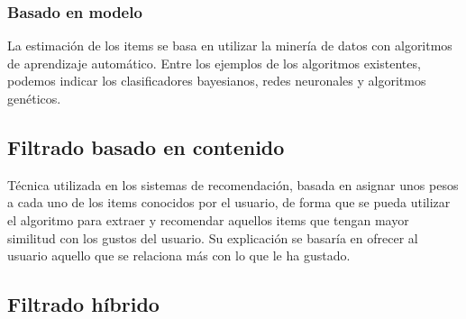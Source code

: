 \subsubsection{Basado en modelo}
La estimación de los items se basa en utilizar la minería de datos con algoritmos de aprendizaje automático. Entre los ejemplos de los algoritmos existentes, podemos indicar los clasificadores bayesianos, redes neuronales y algoritmos genéticos.\nocite{wiki:filtrado} 


\subsection{Filtrado basado en contenido}
Técnica utilizada en los sistemas de recomendación,  basada en asignar unos pesos a cada uno de los items conocidos por el usuario, de forma que se pueda utilizar el algoritmo para extraer y recomendar aquellos items que tengan mayor similitud con los gustos del usuario.
Su explicación se basaría en ofrecer al usuario aquello que se relaciona más con lo que le ha gustado. 

 
\subsection{Filtrado híbrido}


